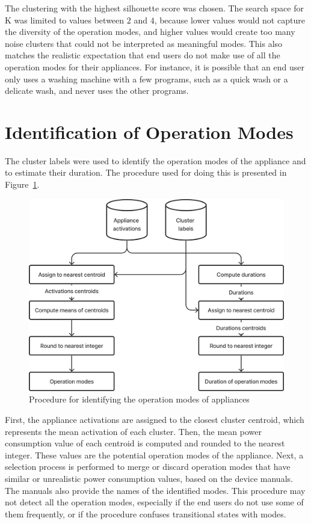 The clustering with the highest silhouette score was chosen. The search space for K was limited to values between \(2\) and \(4\), because lower values would not capture the diversity of the operation modes, and higher values would create too many noise clusters that could not be interpreted as meaningful modes. This also matches the realistic expectation that end users do not make use of all the operation modes for their appliances. For instance, it is possible that an end user only uses a washing machine with a few programs, such as a quick wash or a delicate wash, and never uses the other programs.

\section{Identification of Operation Modes}

The cluster labels were used to identify the operation modes of the appliance and to estimate their duration. The procedure used for doing this is presented in Figure~\ref{fig:identification}.

\begin{figure}
  \centering
  \includegraphics[width=.55\linewidth]{images/modes_clustering/identification.png}
  \caption{Procedure for identifying the operation modes of appliances}%
  \label{fig:identification}
\end{figure}

First, the appliance activations are assigned to the closest cluster centroid, which represents the mean activation of each cluster. Then, the mean power consumption value of each centroid is computed and rounded to the nearest integer. These values are the potential operation modes of the appliance. Next, a selection process is performed to merge or discard operation modes that have similar or unrealistic power consumption values, based on the device manuals. The manuals also provide the names of the identified modes. This procedure may not detect all the operation modes, especially if the end users do not use some of them frequently, or if the procedure confuses transitional states with modes.

